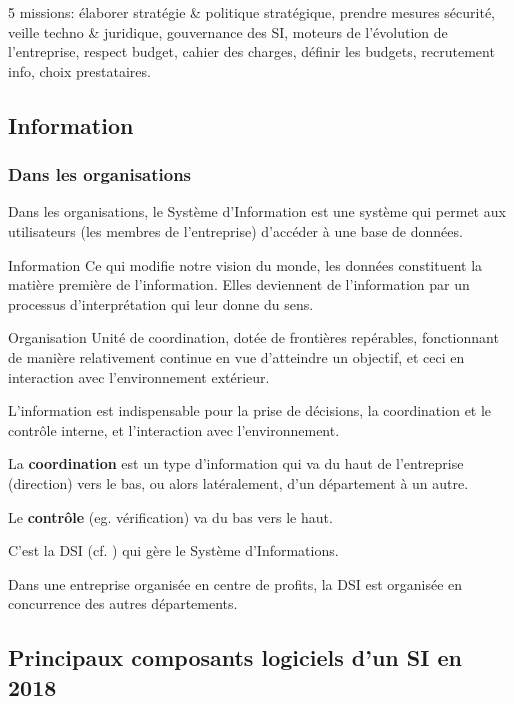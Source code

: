 \documentclass[10pt,a4paper,french]{article}
\begin{document}
5 missions: élaborer stratégie \& politique stratégique, prendre mesures sécurité, veille techno \& juridique, gouvernance des SI, moteurs de l'évolution de l'entreprise, respect budget, cahier des charges, définir les budgets, recrutement info, choix prestataires.

\subsection{Information}

\subsubsection{Dans les organisations}

Dans les organisations, le Système d'Information est une système qui permet aux utilisateurs (les membres de l'entreprise) d'accéder à une base de données.

\begin{cquote}{Information}
Ce qui modifie notre vision du monde, les données constituent la matière première de l'information. Elles deviennent de l'information par un processus d'interprétation qui leur donne du sens.
\end{cquote}

\begin{cquote}{Organisation}
Unité de coordination, dotée de frontières repérables, fonctionnant de manière relativement continue en vue d'atteindre un objectif, et ceci en interaction avec l'environnement extérieur.
\end{cquote}

L'information est indispensable pour la prise de décisions, la coordination et le contrôle interne, et l'interaction avec l'environnement.

La \textbf{coordination} est un type d'information qui va du haut de l'entreprise (direction) vers le bas, ou alors latéralement, d'un département à un autre.

Le \textbf{contrôle} (eg. vérification) va du bas vers le haut.

C'est la DSI (cf. ) qui gère le Système d'Informations.

Dans une entreprise organisée en centre de profits, la DSI est organisée en concurrence des autres départements.

\subsection{Principaux composants logiciels d'un SI en 2018}
\end{document}
